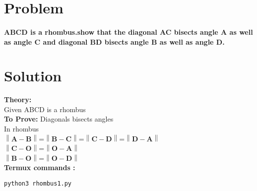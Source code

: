 \documentclass[10pt, a4paper]{article}
\providecommand{\norm}[1]{\left\lVert#1\right\rVert}
\let\vec\mathbf
\begin{document}
\title{\mytitle}
\author{\myauthor\hspace{1em}\\\contact\\FWC22008\hspace{6.5em}IITH\hspace{0.5em}\mymodule\hspace{6em}ASSIGN-4}
\date{}
	\maketitle
		
	\tableofcontents
\vspace{5mm}
   \section{Problem}
\paragraph{ ABCD is a rhombus.show that the diagonal AC bisects angle A as well as angle C and diagonal BD bisects angle B as well as angle D. }
   \section{Solution}
   \textbf{Theory:}\\

   Given  ABCD is a rhombus \\ 
  

\textbf{To Prove:} Diagonals bisects angles\\

In rhombus\\
 $\norm{\vec{A}-\vec{B}}$=$\norm{\vec{B}-\vec{C}}$=$\norm{\vec{C}-\vec{D}}$=$\norm{\vec{D}-\vec{A}}$\\
$\norm{\vec{C}-\vec{O}}$=$\norm{\vec{O}-\vec{A}}$\\
$\norm{\vec{B}-\vec{O}}$=$\norm{\vec{O}-\vec{D}}$\\



\vspace{2mm}
\textbf{Termux commands :}
\begin{lstlisting}
python3 rhombus1.py
\end{lstlisting}
\end{document}

